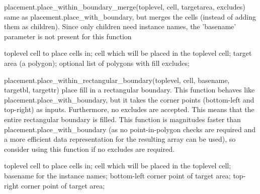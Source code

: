 \begin{APIfunc}{placement.place\_within\_boundary\_merge(toplevel, cell, targetarea, excludes)}
    same as placement.place\_with\_boundary, but merges the cells (instead of adding them as children). Since only children need instance names, the 'basename' parameter is not present for this function
    \begin{APIparameters}
            toplevel cell to place cells in;
            cell which will be placed in the toplevel cell;
            target area (a polygon);
            optional list of polygons with fill excludes;
    \end{APIparameters}
\end{APIfunc}
\begin{APIfunc}{placement.place\_within\_rectangular\_boundary(toplevel, cell, basename, targetbl, targettr)}
    place fill in a rectangular boundary. This function behaves like placement.place\_with\_boundary, but it takes the corner points (bottom-left and top-right) as inputs. Furthermore, no excludes are accepted. This means that the entire rectangular boundary is filled. This function is magnitudes faster than placement.place\_with\_boundary (as no point-in-polygon checks are required and a more efficient data representation for the resulting array can be used), so consider using this function if no excludes are required.
    \begin{APIparameters}
            toplevel cell to place cells in;
            cell which will be placed in the toplevel cell;
            basename for the instance names;
            bottom-left corner point of target area;
            top-right corner point of target area;
    \end{APIparameters}
\end{APIfunc}
